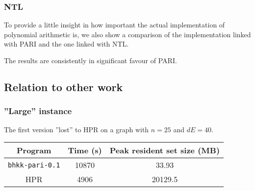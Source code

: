 \documentclass[a4paper]{article}
\newcommand{\code}{\texttt}
\begin{document}
\subsubsection{NTL}
To provide a little insight in how important the actual implementation of polynomial arithmetic is, we also show a comparison of the implementation linked with PARI and the one linked with NTL.
% 

The results are consistently in significant favour of PARI.

\subsection{Relation to other work}


\subsubsection{''Large'' instance}
The first version ''lost'' to HPR on a graph with $n = 25$ and $dE = 40$.
\begin{center}
 \begin{tabular}{|c|c|c|} \hline
  Program & Time (s) & Peak resident set size (MB) \\ \hline
  \code{bhkk-pari-0.1} & 10870 & 33.93 \\ \hline
  HPR & 4906 & 20129.5 \\ \hline
 \end{tabular}
\end{center}
\end{document}
